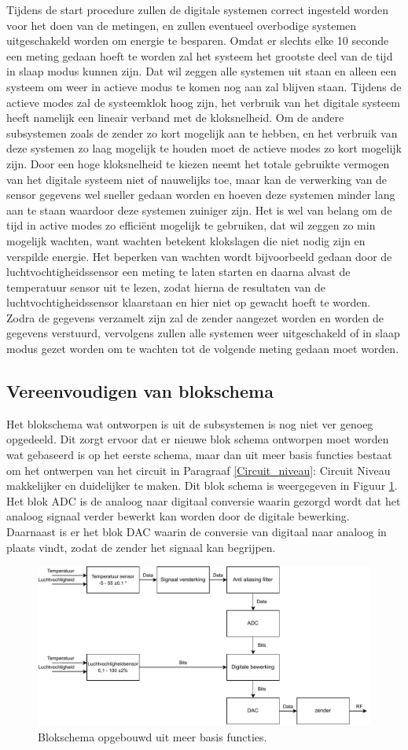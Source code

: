 Tijdens de start procedure zullen de digitale systemen correct ingesteld worden voor het doen van de metingen, en zullen eventueel overbodige systemen uitgeschakeld worden om energie te besparen. Omdat er slechts elke 10 seconde een meting gedaan hoeft te worden zal het systeem het grootste deel van de tijd in slaap modus kunnen zijn. Dat wil zeggen alle systemen uit staan en alleen een systeem om weer in actieve modus te komen nog aan zal blijven staan. Tijdens de actieve modes zal de systeemklok hoog zijn, het verbruik van het digitale systeem heeft namelijk een lineair verband met de kloksnelheid. Om de andere subsystemen zoals de zender zo kort mogelijk aan te hebben, en het verbruik van deze systemen zo laag mogelijk te houden moet de actieve modes zo kort mogelijk zijn. Door een hoge kloksnelheid te kiezen neemt het totale gebruikte vermogen van het digitale systeem niet of nauwelijks toe, maar kan de verwerking van de sensor gegevens wel sneller gedaan worden en hoeven deze systemen minder lang aan te staan waardoor deze systemen zuiniger zijn. Het is wel van belang om de tijd in active modes zo efficiënt mogelijk te gebruiken, dat wil zeggen zo min mogelijk wachten, want wachten betekent klokslagen die niet nodig zijn en verspilde energie. Het beperken van wachten wordt bijvoorbeeld gedaan door de luchtvochtigheidssensor een meting te laten starten en daarna alvast de temperatuur sensor uit te lezen, zodat hierna de resultaten van de luchtvochtigheidssensor klaarstaan en hier niet op gewacht hoeft te worden. Zodra de gegevens verzamelt zijn zal de zender aangezet worden en worden de gegevens verstuurd, vervolgens zullen alle systemen weer uitgeschakeld of in slaap modus gezet worden om te wachten tot de volgende meting gedaan moet worden.


\subsection{Vereenvoudigen van blokschema}
Het blokschema wat ontworpen is uit de subsystemen is nog niet ver genoeg opgedeeld. Dit zorgt ervoor dat er nieuwe blok schema ontworpen moet worden wat gebaseerd is op het eerste schema, maar dan uit meer basis functies bestaat om het ontwerpen van het circuit in Paragraaf \ref{Circuit_niveau}: Circuit Niveau makkelijker en duidelijker te maken. Dit blok schema is weergegeven in Figuur \ref{fig:bigger_blok_schematic}. Het blok ADC is de analoog naar digitaal conversie waarin gezorgd wordt dat het analoog signaal verder bewerkt kan worden door de digitale bewerking. Daarnaast is er het blok DAC waarin de conversie van digitaal naar analoog in plaats vindt, zodat de zender het signaal kan begrijpen.

\begin{figure}[H]
    \centering
    \includegraphics[width=1\linewidth]{pictures/blokschema.drawio.pdf}
    \caption{Blokschema opgebouwd uit meer basis functies.}
    \label{fig:bigger_blok_schematic}
\end{figure}
